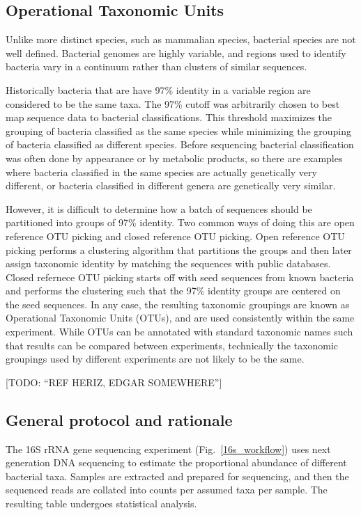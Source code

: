 \subsection{Operational Taxonomic Units}
Unlike more distinct species, such as mammalian species, bacterial species are not well defined. Bacterial genomes are highly variable, and regions used to identify bacteria vary in a continuum rather than clusters of similar sequences.

Historically bacteria that are have 97\% identity in a variable region are considered to be the same taxa. The 97\% cutoff was arbitrarily chosen to best map sequence data to bacterial classifications. This threshold maximizes the grouping of bacteria classified as the same species while minimizing the grouping of bacteria classified as different species. Before sequencing bacterial classification was often done by appearance or by metabolic products, so there are examples where bacteria classified in the same species are actually genetically very different, or bacteria classified in different genera are genetically very similar.

However, it is difficult to determine how a batch of sequences should be partitioned into groups of 97\% identity. Two common ways of doing this are open reference OTU picking and closed reference OTU picking. Open reference OTU picking performs a clustering algorithm that partitions the groups and then later assign taxonomic identity by matching the sequences with public databases. Closed refernece OTU picking starts off with seed sequences from known bacteria and performs the clustering such that the 97\% identity groups are centered on the seed sequences. In any case, the resulting taxonomic groupings are known as Operational Taxonomic Units (OTUs), and are used consistently within the same experiment. While OTUs can be annotated with standard taxonomic names such that results can be compared between experiments, technically the taxonomic groupings used by different experiments are not likely to be the same.

[TODO: ``REF HERIZ, EDGAR SOMEWHERE'']

\subsection{General protocol and rationale}
The 16S rRNA gene sequencing experiment (Fig.~\ref{16s_workflow}) uses next generation DNA sequencing to estimate the proportional abundance of different bacterial taxa. Samples are extracted and prepared for sequencing, and then the sequenced reads are collated into counts per assumed taxa per sample. The resulting table undergoes statistical analysis.

